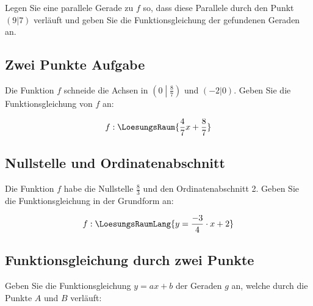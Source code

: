 Legen Sie eine parallele Gerade zu $f$ so, dass diese Parallele durch
den Punkt $(9|7)$ verläuft und geben Sie die Funktionsgleichung der
gefundenen Geraden an.

\vspace{15mm}
\subsection{Zwei Punkte Aufgabe}
Die Funktion $f$ schneide die Achsen in $\left(0\middle|\frac87\right)$ und
$(-2|0)$. Geben Sie die Funktionsgleichung von $f$ an:

\vspace{20mm}

$$f: \LoesungsRaum{\frac47x + \frac87}$$

\subsection{Nullstelle und Ordinatenabschnitt}
Die Funktion $f$ habe die Nullstelle $\frac83$ und den
Ordinatenabschnitt 2. Geben Sie die Funktionsgleichung in der
Grundform an:

\vspace{20mm}
$$f: \LoesungsRaumLang{y = \frac{-3}4 \cdot{} x + 2}$$

\subsection{Funktionsgleichung durch zwei Punkte}
Geben Sie die Funktionsgleichung $y=ax+b$ der Geraden $g$ an, welche
durch die Punkte $A$ und $B$ verläuft:

